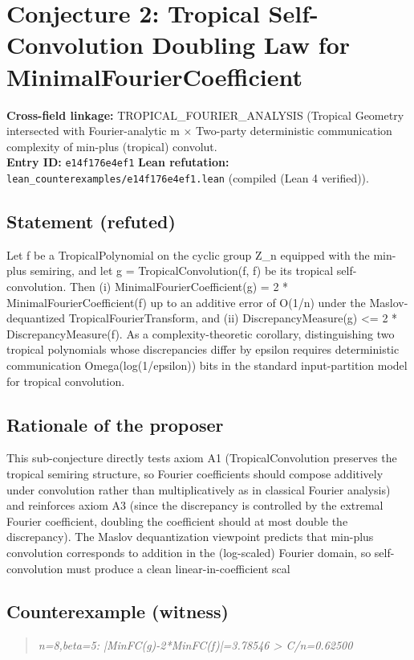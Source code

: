 \documentclass[11pt,a4paper]{article}
\begin{document}
\section{Conjecture 2: Tropical Self-Convolution Doubling Law for MinimalFourierCoefficient}
\textbf{Cross-field linkage:} TROPICAL\_FOURIER\_ANALYSIS (Tropical Geometry intersected with Fourier-analytic m $\times$ Two-party deterministic communication complexity of min-plus (tropical) convolut.\\
\textbf{Entry ID:} \texttt{e14f176e4ef1}\quad
\textbf{Lean refutation:} \texttt{lean\_counterexamples/e14f176e4ef1.lean} (compiled (Lean 4 verified)).

\subsection*{Statement (refuted)}
Let f be a TropicalPolynomial on the cyclic group Z\_n equipped with the min-plus semiring, and let g = TropicalConvolution(f, f) be its tropical self-convolution. Then (i) MinimalFourierCoefficient(g) = 2 * MinimalFourierCoefficient(f) up to an additive error of O(1/n) under the Maslov-dequantized TropicalFourierTransform, and (ii) DiscrepancyMeasure(g) <= 2 * DiscrepancyMeasure(f). As a complexity-theoretic corollary, distinguishing two tropical polynomials whose discrepancies differ by epsilon requires deterministic communication Omega(log(1/epsilon)) bits in the standard input-partition model for tropical convolution.

\subsection*{Rationale of the proposer}
This sub-conjecture directly tests axiom A1 (TropicalConvolution preserves the tropical semiring structure, so Fourier coefficients should compose additively under convolution rather than multiplicatively as in classical Fourier analysis) and reinforces axiom A3 (since the discrepancy is controlled by the extremal Fourier coefficient, doubling the coefficient should at most double the discrepancy). The Maslov dequantization viewpoint predicts that min-plus convolution corresponds to addition in the (log-scaled) Fourier domain, so self-convolution must produce a clean linear-in-coefficient scal

\subsection*{Counterexample (witness)}
\begin{quote}\itshape
n=8,beta=5: |MinFC(g)-2*MinFC(f)|=3.78546 > C/n=0.62500
\end{quote}
\end{document}
